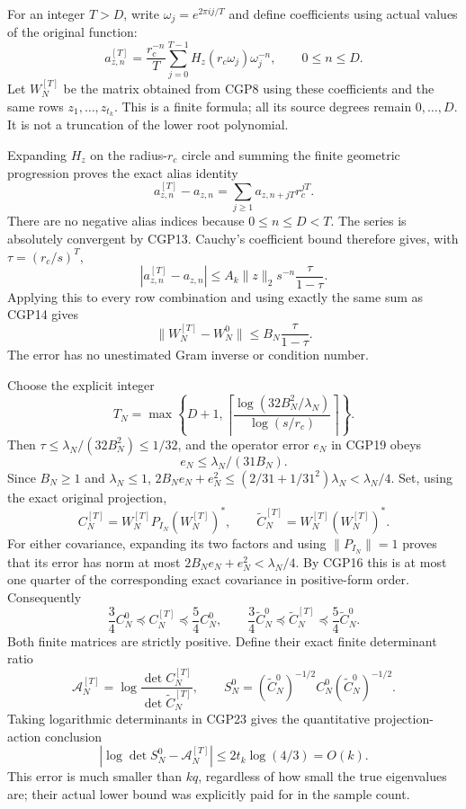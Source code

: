 For an integer \(T>D\), write \(\omega_j=e^{2\pi ij/T}\) and define coefficients using actual values of the original function: \[
a_{z,n}^{[T]}=\frac{r_c^{-n}}{T}
\sum_{j=0}^{T-1}H_z(r_c\omega_j)\omega_j^{-n},
\qquad 0\le n\le D.
\tag{CGP17}
\] Let \(W_N^{[T]}\) be the matrix obtained from CGP8 using these coefficients and the same rows \(z_1,\ldots,z_{t_k}\). This is a finite formula; all its source degrees remain \(0,\ldots,D\). It is not a truncation of the lower root polynomial.

Expanding \(H_z\) on the radius-\(r_c\) circle and summing the finite geometric progression proves the exact alias identity \[
a_{z,n}^{[T]}-a_{z,n}
=\sum_{j\ge1}a_{z,n+jT}r_c^{jT}.
\tag{CGP18}
\] There are no negative alias indices because \(0\le n\le D<T\). The series is absolutely convergent by CGP13. Cauchy's coefficient bound therefore gives, with \(\tau=(r_c/s)^T\), \[
|a_{z,n}^{[T]}-a_{z,n}|
\le A_k\|z\|_2s^{-n}\frac{\tau}{1-\tau}.
\] Applying this to every row combination and using exactly the same sum as CGP14 gives \[
\boxed{\|W_N^{[T]}-W_N^0\|
\le B_N\frac{\tau}{1-\tau}.}
\tag{CGP19}
\] The error has no unestimated Gram inverse or condition number.

Choose the explicit integer \[
T_N=\max\left\{D+1,
\left\lceil\frac{\log(32B_N^2/\lambda_N)}
{\log(s/r_c)}\right\rceil\right\}.
\tag{CGP20}
\] Then \(\tau\le\lambda_N/(32B_N^2)\le1/32\), and the operator error \(e_N\) in CGP19 obeys \[
e_N\le\lambda_N/(31B_N).
\tag{CGP21}
\] Since \(B_N\ge1\) and \(\lambda_N\le1\), \(2B_Ne_N+e_N^2\le(2/31+1/31^2)\lambda_N
<\lambda_N/4\). Set, using the exact original projection, \[
C_N^{[T]}=W_N^{[T]}P_{I_N}(W_N^{[T]})^*,\qquad
\widetilde C_N^{[T]}=W_N^{[T]}(W_N^{[T]})^*.
\tag{CGP22}
\] For either covariance, expanding its two factors and using \(\|P_{I_N}\|=1\) proves that its error has norm at most \(2B_Ne_N+e_N^2<\lambda_N/4\). By CGP16 this is at most one quarter of the corresponding exact covariance in positive-form order. Consequently \[
\frac34 C_N^0\preceq C_N^{[T]}\preceq\frac54 C_N^0,
\qquad
\frac34\widetilde C_N^0\preceq\widetilde C_N^{[T]}
\preceq\frac54\widetilde C_N^0.
\tag{CGP23}
\] Both finite matrices are strictly positive. Define their exact finite determinant ratio \[
\mathcal A_N^{[T]}=
\log\frac{\det C_N^{[T]}}{\det\widetilde C_N^{[T]}},
\qquad
S_N^0=(\widetilde C_N^0)^{-1/2}C_N^0
(\widetilde C_N^0)^{-1/2}.
\] Taking logarithmic determinants in CGP23 gives the quantitative projection-action conclusion \[
\boxed{|\log\det S_N^0-\mathcal A_N^{[T]}|
\le2t_k\log(4/3)=O(k).}
\tag{CGP24}
\] This error is much smaller than \(kq\), regardless of how small the true eigenvalues are; their actual lower bound was explicitly paid for in the sample count.

